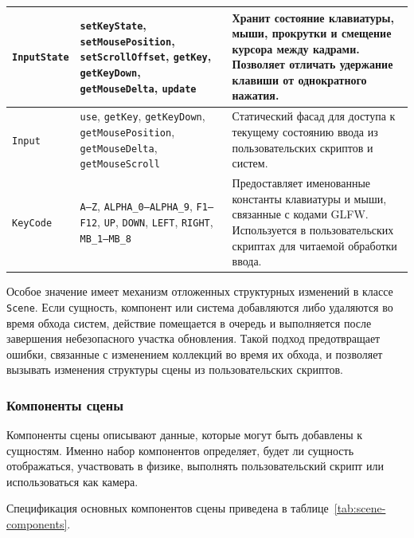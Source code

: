 \begin{xltabular}{\textwidth}{|p{0.22\textwidth}|p{0.26\textwidth}|X|}
\hline
\texttt{InputState} & \texttt{setKeyState}, \texttt{setMousePosition}, \texttt{setScrollOffset}, \texttt{getKey}, \texttt{getKeyDown}, \texttt{getMouseDelta}, \texttt{update} & Хранит состояние клавиатуры, мыши, прокрутки и смещение курсора между кадрами. Позволяет отличать удержание клавиши от однократного нажатия. \\
\hline
\texttt{Input} & \texttt{use}, \texttt{getKey}, \texttt{getKeyDown}, \texttt{getMousePosition}, \texttt{getMouseDelta}, \texttt{getMouseScroll} & Статический фасад для доступа к текущему состоянию ввода из пользовательских скриптов и систем. \\
\hline
\texttt{KeyCode} & \texttt{A--Z}, \texttt{ALPHA\_0--ALPHA\_9}, \texttt{F1--F12}, \texttt{UP}, \texttt{DOWN}, \texttt{LEFT}, \texttt{RIGHT}, \texttt{MB\_1--MB\_8} & Предоставляет именованные константы клавиатуры и мыши, связанные с кодами GLFW. Используется в пользовательских скриптах для читаемой обработки ввода. \\
\hline
\end{xltabular}
\renewcommand{\arraystretch}{1.0}
\endgroup

Особое значение имеет механизм отложенных структурных изменений в классе
\texttt{Scene}. Если сущность, компонент или система добавляются либо удаляются
во время обхода систем, действие помещается в очередь и выполняется после
завершения небезопасного участка обновления. Такой подход предотвращает ошибки,
связанные с изменением коллекций во время их обхода, и позволяет вызывать
изменения структуры сцены из пользовательских скриптов.

\subsubsection{Компоненты сцены}

Компоненты сцены описывают данные, которые могут быть добавлены к сущностям.
Именно набор компонентов определяет, будет ли сущность отображаться, участвовать
в физике, выполнять пользовательский скрипт или использоваться как камера.

Спецификация основных компонентов сцены приведена в таблице~\ref{tab:scene-components}.

